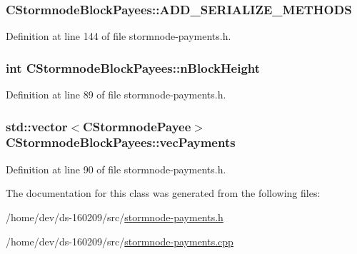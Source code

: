 \subsubsection[{A\+D\+D\+\_\+\+S\+E\+R\+I\+A\+L\+I\+Z\+E\+\_\+\+M\+E\+T\+H\+O\+D\+S}]{\setlength{\rightskip}{0pt plus 5cm}C\+Stormnode\+Block\+Payees\+::\+A\+D\+D\+\_\+\+S\+E\+R\+I\+A\+L\+I\+Z\+E\+\_\+\+M\+E\+T\+H\+O\+D\+S}\label{class_c_stormnode_block_payees_acf19163e4d9f268dfb698f067f72baa7}


Definition at line 144 of file stormnode-\/payments.\+h.

\hypertarget{class_c_stormnode_block_payees_a416f3766bb7df6d02f83f0eb34aafe62}{}
\subsubsection[{n\+Block\+Height}]{\setlength{\rightskip}{0pt plus 5cm}int C\+Stormnode\+Block\+Payees\+::n\+Block\+Height}\label{class_c_stormnode_block_payees_a416f3766bb7df6d02f83f0eb34aafe62}


Definition at line 89 of file stormnode-\/payments.\+h.

\hypertarget{class_c_stormnode_block_payees_ac60f49701f0c229b4ff6dfaad6d3af36}{}
\subsubsection[{vec\+Payments}]{\setlength{\rightskip}{0pt plus 5cm}std\+::vector$<${\bf C\+Stormnode\+Payee}$>$ C\+Stormnode\+Block\+Payees\+::vec\+Payments}\label{class_c_stormnode_block_payees_ac60f49701f0c229b4ff6dfaad6d3af36}


Definition at line 90 of file stormnode-\/payments.\+h.



The documentation for this class was generated from the following files\+:\begin{DoxyCompactItemize}
\item 
/home/dev/ds-\/160209/src/\hyperlink{stormnode-payments_8h}{stormnode-\/payments.\+h}\item 
/home/dev/ds-\/160209/src/\hyperlink{stormnode-payments_8cpp}{stormnode-\/payments.\+cpp}\end{DoxyCompactItemize}
